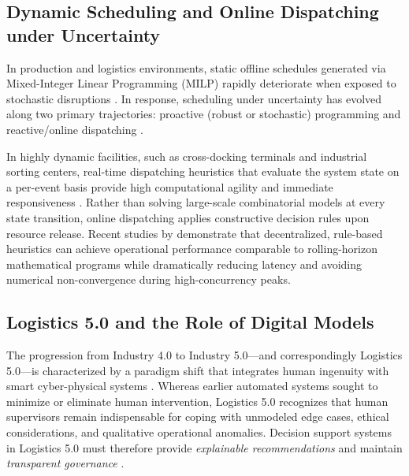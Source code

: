 \documentclass[11pt,a4paper]{article}
\begin{document}
\subsection{Dynamic Scheduling and Online Dispatching under Uncertainty}
In production and logistics environments, static offline schedules generated via Mixed-Integer Linear Programming (MILP) rapidly deteriorate when exposed to stochastic disruptions \parencite{liProcessSchedulingUncertainty2008a}. In response, scheduling under uncertainty has evolved along two primary trajectories: proactive (robust or stochastic) programming and reactive/online dispatching \parencite{boysenCrossDockScheduling2010a, nasiriPredictivereactiveCrossdockRescheduling2022}.

In highly dynamic facilities, such as cross-docking terminals and industrial sorting centers, real-time dispatching heuristics that evaluate the system state on a per-event basis provide high computational agility and immediate responsiveness \parencite{langeDispatchingStrategiesDrayage2018a, wangFlexibleStorageYard2023, fonsecaStabilityApproachCDC2025}. Rather than solving large-scale combinatorial models at every state transition, online dispatching applies constructive decision rules upon resource release. Recent studies by \textcite{torbaliMultiagentbasedRealtimeTruck2023} demonstrate that decentralized, rule-based heuristics can achieve operational performance comparable to rolling-horizon mathematical programs while dramatically reducing latency and avoiding numerical non-convergence during high-concurrency peaks.

\subsection{Logistics 5.0 and the Role of Digital Models}
The progression from Industry 4.0 to Industry 5.0—and correspondingly Logistics 5.0—is characterized by a paradigm shift that integrates human ingenuity with smart cyber-physical systems \parencite{dasilvaIntegrationMachineLearning2023}. Whereas earlier automated systems sought to minimize or eliminate human intervention, Logistics 5.0 recognizes that human supervisors remain indispensable for coping with unmodeled edge cases, ethical considerations, and qualitative operational anomalies. Decision support systems in Logistics 5.0 must therefore provide \emph{explainable recommendations} and maintain \emph{transparent governance} \parencite{mardanehDecisionSupportSystem2021a}.
\end{document}
